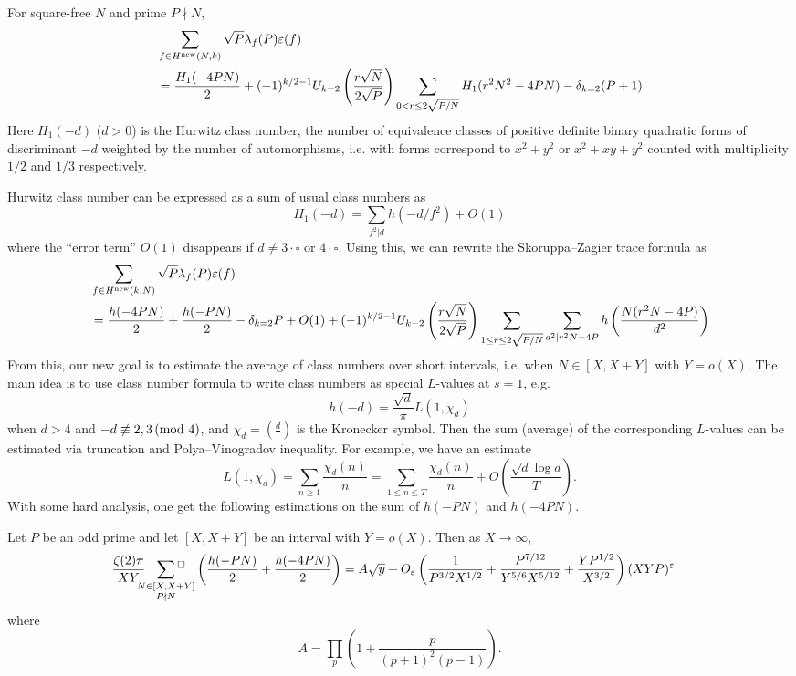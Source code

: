 \begin{theorem}
    \label{thm:sz_tf}
    For square-free $N$ and prime $P \nmid N$,
    \begin{align*}
        &\sum_{f \in H^{\mathrm{new}}(N, k)} \sqrt{P} \lambda_f(P) \varepsilon(f)\nonumber \\
        &= \frac{H_1(-4PN)}{2} + (-1)^{k/2 - 1} U_{k - 2} \left(\frac{r\sqrt{N}}{2\sqrt{P}}\right) \sum_{0 < r \le 2\sqrt{P/N}} H_1(r^2 N^2 - 4PN) - \delta_{k=2}(P+1)
    \end{align*}
    Here $H_1(-d)$ ($d > 0$) is the Hurwitz class number, the number of equivalence classes of positive definite binary quadratic forms of discriminant $-d$ weighted by the number of automorphisms, i.e. with forms correspond to $x^2 + y^2$ or $x^2 + xy + y^2$ counted with multiplicity $1/2$ and $1/3$ respectively.
\end{theorem}

Hurwitz class number can be expressed as a sum of usual class numbers as
\[
H_1(-d) = \sum_{f^2 | d} h(-d / f^2) + O(1)
\]
where the ``error term'' $O(1)$ disappears if $d \ne 3 \cdot \square$ or $4 \cdot \square$.
Using this, we can rewrite the Skoruppa--Zagier trace formula as
\begin{align*}
    &\sum_{f \in H^{\mathrm{new}}(k, N)} \sqrt{P} \lambda_f(P) \varepsilon(f) \\
    &= \frac{h(-4PN)}{2} + \frac{h(-PN)}{2} - \delta_{k=2} P + O(1) + (-1)^{k/2 - 1} U_{k-2} \left(\frac{r\sqrt{N}}{2\sqrt{P}}\right) \sum_{1 \le r \le 2\sqrt{P/N}} \sum_{d^2 | r^2 N - 4P} h\left(\frac{N(r^2 N - 4P)}{d^2}\right)
\end{align*}
From this, our new goal is to estimate the average of class numbers over short intervals, i.e. when $N \in [X, X + Y]$ with $Y = o(X)$.
The main idea is to use class number formula to write class numbers as special $L$-values at $s = 1$, e.g.
\[
h(-d) = \frac{\sqrt{d}}{\pi} L(1, \chi_d)
\]
when $d > 4$ and $-d \not\equiv 2,3 \,(\text{mod }4)$, and $\chi_d = \left(\frac{d}{\cdot}\right)$ is the Kronecker symbol.
Then the sum (average) of the corresponding $L$-values can be estimated via truncation and Polya--Vinogradov inequality.
For example, we have an estimate
\[
L(1, \chi_d) = \sum_{n \ge 1} \frac{\chi_d(n)}{n} = \sum_{1 \le n \le T} \frac{\chi_d(n)}{n} + O\left(\frac{\sqrt{d} \log d}{T}\right).
\]
With some hard analysis, one get the following estimations on the sum of $h(-PN)$ and $h(-4PN)$.
\begin{proposition}
    Let $P$ be an odd prime and let $[X, X + Y]$ be an interval with $Y = o(X)$.
    Then as $X \to \infty$,
    \begin{align*}
        &\frac{\zeta(2) \pi}{XY} \sideset{}{{}^\square}\sum_{\substack{N \in [X, X + Y] \\ P \nmid N}}  \left(\frac{h(-PN)}{2} + \frac{h(-4PN)}{2} \right) = A \sqrt{y} + O_{\varepsilon} \left(\frac{1}{P^{3/2}X^{1/2}} + \frac{P^{7/12}}{Y^{5/6} X^{5/12}} + \frac{YP^{1/2}}{X^{3/2}}\right) (XYP)^{\varepsilon}
    \end{align*}
    where
    \[
    A = \prod_p \left(1 + \frac{p}{(p + 1)^2 (p - 1)}\right).
    \]
\end{proposition}

